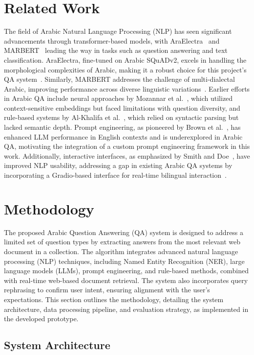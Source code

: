 \documentclass[conference]{IEEEtran}
\begin{document}
\section{Related Work}
The field of Arabic Natural Language Processing (NLP) has seen significant advancements through transformer-based models, with AraElectra~\cite{b4} and MARBERT~\cite{b4} leading the way in tasks such as question answering and text classification. AraElectra, fine-tuned on Arabic SQuADv2, excels in handling the morphological complexities of Arabic, making it a robust choice for this project’s QA system~\cite{b5}. Similarly, MARBERT addresses the challenge of multi-dialectal Arabic, improving performance across diverse linguistic variations~\cite{b5}. Earlier efforts in Arabic QA include neural approaches by Mozannar et al.~\cite{b5}, which utilized context-sensitive embeddings but faced limitations with question diversity, and rule-based systems by Al-Khalifa et al.~\cite{b5}, which relied on syntactic parsing but lacked semantic depth. Prompt engineering, as pioneered by Brown et al.~\cite{b4}, has enhanced LLM performance in English contexts and is underexplored in Arabic QA, motivating the integration of a custom prompt engineering framework in this work. Additionally, interactive interfaces, as emphasized by Smith and Doe~\cite{b6}, have improved NLP usability, addressing a gap in existing Arabic QA systems by incorporating a Gradio-based interface for real-time bilingual interaction~\cite{b6}.


\section{Methodology}

The proposed Arabic Question Answering (QA) system is designed to address a limited set of question types by extracting answers from the most relevant web document in a collection. The algorithm integrates advanced natural language processing (NLP) techniques, including Named Entity Recognition (NER), large language models (LLMs), prompt engineering, and rule-based methods, combined with real-time web-based document retrieval. The system also incorporates query rephrasing to confirm user intent, ensuring alignment with the user's expectations. This section outlines the methodology, detailing the system architecture, data processing pipeline, and evaluation strategy, as implemented in the developed prototype.

\subsection{System Architecture}
\end{document}

